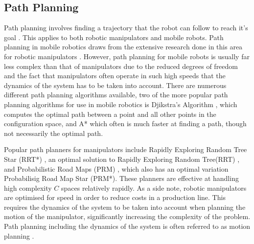 \subsection{Path Planning}
Path planning involves finding a trajectory that the robot can follow to reach it's goal \cite{SiegwartRoland2011Itam}. This applies to both robotic manipulators and mobile robots. Path planning in mobile robotics draws from the extensive research done in this area for robotic manipulators \cite{SiegwartRoland2011Itam}. However, path planning for mobile robots is usually far less complex than that of manipulators due to the reduced degrees of freedom and the fact that manipulators often operate in such high speeds that the dynamics of the system has to be taken into account\cite{SiegwartRoland2011Itam}. There are numerous different path planning algorithms available, two of the more popular path planning algorithms for use in mobile robotics is Djikstra's Algorithm \cite{DijkstraE.W1959Anot}, which computes the optimal path between a point and all other points in the configuration space, and A* \cite{HartNilsson1968} which often is much faster at finding a path, though not necessarily the optimal path.

Popular path planners for manipulators include Rapidly Exploring Random Tree Star (RRT*) \cite{KaramanSertac2011Safo}, an optimal solution to Rapidly Exploring Random Tree(RRT) \cite{LaValleStevenM.2001RKP}, and Probabilistic Road Maps (PRM) \cite{KavrakiL.E.1996Prfp}, which also has an optimal variation Probabilisig Road Map Star (PRM*)\cite{KavrakiL.E.1996Prfp}. These planners are effective at handling high complexity $C$ spaces relatively rapidly\cite{LynchKevin2017Mr:m}. As a side note, robotic manipulators are optimised for speed in order to reduce costs in a production line. This requires the dynamics of the system to be taken into account when planning the motion of the manipulator, significantly increasing the complexity of the problem. Path planning including the dynamics of the system is often referred to as motion planning \cite{LynchKevin2017Mr:m}.

